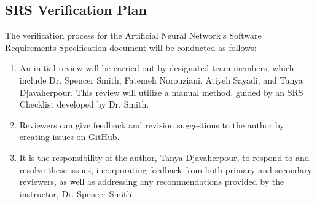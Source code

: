 \documentclass[12pt, titlepage]{article}
\begin{document}
\begin{center}
  \begin{table}[h]
  \caption{Verification and validation team} 
  \label{VnVTeamTable}
  \end{table}
  \end{center}


\subsection{SRS Verification Plan}\label{SRSVerPlan}

The verification process for the Artificial Neural Network's Software Requirements Specification 
document will be conducted as follows:

\begin{enumerate}
  \item An initial review will be carried out by designated team members, which include Dr. 
    Spencer Smith, Fatemeh Norouziani, Atiyeh Sayadi, and Tanya Djavaherpour. 
    This review will utilize a manual method, guided by an 
    SRS Checklist \cite{SRS-Checklist} developed by Dr. Smith.
  \item Reviewers can give feedback and revision suggestions to the author by creating issues on GitHub.
  \item It is the responsibility of the author, Tanya Djavaherpour, to respond to and 
  resolve these issues, incorporating feedback from both primary and secondary reviewers, 
  as well as addressing any recommendations provided by the instructor, Dr. Spencer Smith.
\end{enumerate}
\end{document}
